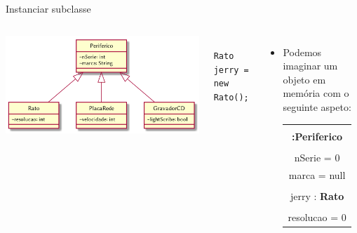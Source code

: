\documentclass[portuguese, aspectratio=169, xcolor=table]{beamer}
\begin{document}
\begin{frame}[fragile]{Instanciar subclasse}
\begin{columns}
    \begin{center}
        \includegraphics[width=\linewidth]{./uml_diagrams/class8}
    \end{center}
    \begin{verbatim}
    Rato jerry = new Rato();
    \end{verbatim}
\begin{itemize}
    \item Podemos imaginar um objeto em memória com o seguinte aspeto:
    \begin{center}
        \begin{tabular}{|c|}
            \hline\\
            \textbf{:Periferico}\\
            \hline\\
            nSerie = 0\\
            marca = null\\
            \hline
            \hdashline\\
            \hline
            jerry : \textbf{Rato}\\
            \hline\\
            resolucao = 0\\
            \hline
        \end{tabular}
    \end{center}
\end{itemize}
\end{columns}
\end{frame}
\end{document}
